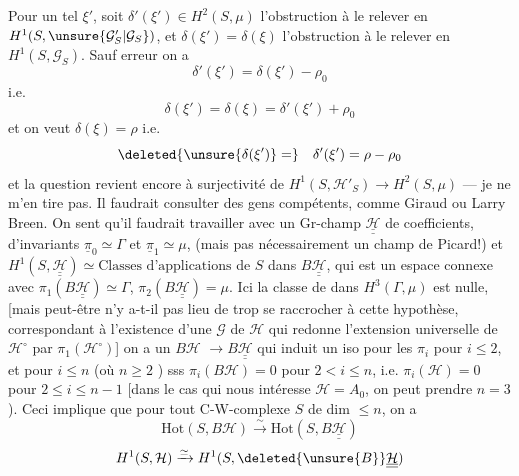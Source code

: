 Pour un tel  $\xi'$, soit
$\delta'(\xi')\in H^2(S,\mu)$
l'obstruction à le relever en $H^1(S,\unsure{\mathcal G'_S|\mathcal G_S})$,
et $\delta(\xi')=\delta(\xi)$ l'obstruction à le relever
en $H^1(S,\mathcal G_S)$. Sauf erreur on a
\[
\delta'(\xi')=\delta(\xi')-\rho_0
\]
i.e.
\[
\delta(\xi')=\delta(\xi)=\delta'(\xi')+\rho_0
\]
et on veut $\delta(\xi)=\rho$ i.e.
\[
\deleted{\unsure{\delta(\xi')}=}\quad
\delta'(\xi')=\rho-\rho_0
\]
et la question revient encore à  
surjectivité de $H^1(S,\mathcal H'_S)\longrightarrow H^2(S,\mu)$
--- je ne m'en tire pas. Il faudrait
consulter des gens compétents, comme
Giraud ou Larry Breen. On sent qu'il
faudrait travailler avec un Gr-champ $\underline{\underline{\mathcal H}}$
de coefficients, d'invariants $\underline{\pi}_0\simeq\Gamma$ et
$\underline{\pi}_1\simeq\mu$,
(mais pas nécessairement un champ de Picard!)
 et
$H^1(S,\underline{\underline{\mathcal H}})\simeq\text{Classes d'applications}$
de $S$ dans $B\underline{\underline{\mathcal H}}$, qui est un espace
connexe avec $\pi_1(B\underline{\underline{\mathcal H}})\simeq\Gamma$,
$\pi_2(B\underline{\underline{\mathcal H}})=\mu$.
Ici la classe de  dans $H^3(\Gamma,\mu)$ est nulle,
[mais peut-être n'y a-t-il pas lieu de
trop se raccrocher à cette hypothèse,
correspondant à l'existence d'une  $\mathcal G$ de $\mathcal H$
 
qui redonne l'extension universelle de
$\mathcal H^\circ$ par $\pi_1(\mathcal H^\circ)$] on a un 
$B\mathcal H$  $\longrightarrow B\underline{\underline{\mathcal H}}$
qui induit un iso pour
les $\pi_i$ pour $i\leq2$, et pour $i\leq n$
(où $n\geq2$ )
sss $\pi_i(B\mathcal H)=0$ pour $2<i\leq n$, i.e.
$\pi_i(\mathcal H)=0$ pour $2\leq i\leq n-1$ [dans le cas
qui nous intéresse $\mathcal H=A_0$, on peut
prendre $n=3$). Ceci implique que pour
tout C-W-complexe $S$ de dim $\leq n$,
on a 
\[
\mathrm{Hot}(S,B\mathcal H)\xrightarrow{\sim}
\mathrm{Hot}(S,B\underline{\underline{\mathcal H}})
\]
\[
H^1(S,\mathcal H)\xrightarrow{\simeq}
H^1(S,\deleted{\unsure{B}}\underline{\underline{\mathcal H}})
\]

